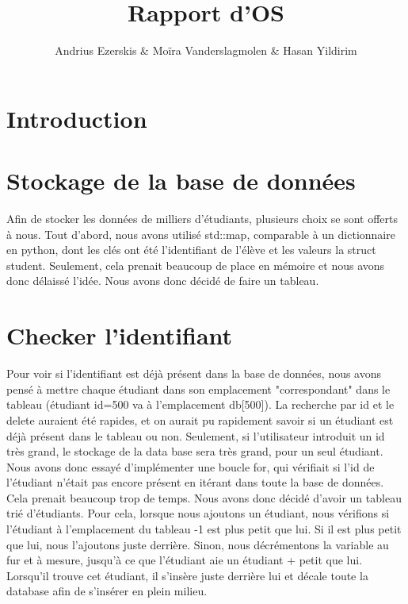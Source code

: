 \documentclass[utf8]{article}
\begin{document}
\begin{titlepage}
    

\author{Andrius Ezerskis \& Moïra Vanderslagmolen \& Hasan Yildirim}
\title{Rapport d'OS}

\maketitle
\end{titlepage}

\section{Introduction}

\section{Stockage de la base de données}
\indent{}
\par
Afin de stocker les données de milliers d'étudiants, plusieurs choix se sont offerts à nous. 
Tout d'abord, nous avons utilisé std::map, comparable à un dictionnaire en python, dont les
clés ont été l'identifiant de l'élève et les valeurs la struct student. Seulement, cela
prenait beaucoup de place en mémoire et nous avons donc délaissé l'idée. Nous avons donc décidé de faire un tableau.
\par
\section{Checker l'identifiant}
\indent{}
\par
Pour voir si l'identifiant est déjà présent dans la base de données, nous avons pensé à mettre chaque étudiant
dans son emplacement "correspondant" dans le tableau (étudiant id=500 va à l'emplacement db[500]). La recherche par id et le delete auraient été rapides, et on 
aurait pu rapidement savoir si un étudiant est déjà présent dans le tableau ou non.
Seulement, si l'utilisateur introduit un id très grand, le stockage de la data base sera très grand, pour un seul étudiant.
Nous avons donc essayé d'implémenter une boucle for, qui vérifiait si l'id de l'étudiant n'était pas encore présent en itérant dans toute la base de données.
Cela prenait beaucoup trop de temps. Nous avons donc décidé d'avoir un tableau trié d'étudiants. Pour cela, lorsque nous ajoutons un étudiant,
nous vérifions si l'étudiant à l'emplacement du tableau -1 est plus petit que lui. Si il est plus petit que lui, nous l'ajoutons juste derrière. Sinon, 
nous décrémentons la variable au fur et à mesure, jusqu'à ce que l'étudiant aie un étudiant + petit que lui. Lorsqu'il trouve cet étudiant, il s'insère juste derrière lui
et décale toute la database afin de s'insérer en plein milieu.
\par
\end{document}
